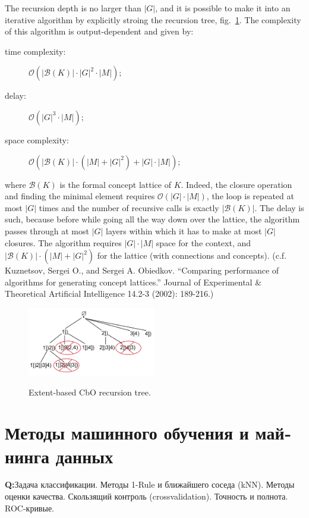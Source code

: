 \documentclass[a4paper]{article}
\newcommand{\rus}[1]{\foreignlanguage{russian}{#1}}
\begin{document}
The recursion depth is no larger than $|G|$, and it is possible to make it into an
iterative algorithm by explicitly stroing the recursion tree, fig.~\ref{fig:cbo_tree}.
The complexity of this algorithm is output-dependent and given by:
\begin{description}
    \item[time complexity:] $\mathcal{O}(|\mathcal{B}(K)|\cdot |G|^2 \cdot |M|)$;
    \item[delay:] $\mathcal{O}(|G|^3 \cdot |M|)$;
    \item[space complexity:] $\mathcal{O}(|\mathcal{B}(K)|\cdot(|M| + |G|^2)
                                          + |G| \cdot |M|)$;
\end{description}
where $\mathcal{B}(K)$ is the formal concept lattice of $K$. Indeed, the closure
operation and finding the minimal element requires $\mathcal{O}(|G| \cdot |M|)$,
the loop is repeated at most $|G|$ times and the number of recursive calls is exactly
$|\mathcal{B}(K)|$. The delay is such, because before while going all the way down
over the lattice, the algorithm passes through at most $|G|$ layers within which
it has to make at most $|G|$ closures. The algorithm requires $|G| \cdot |M|$ space
for the context, and $|\mathcal{B}(K)|\cdot(|M| + |G|^2)$ for the lattice (with
connections and concepts).
(c.f. Kuznetsov, Sergei O., and Sergei A. Obiedkov. ``Comparing performance of algorithms
for generating concept lattices.'' Journal of Experimental \& Theoretical Artificial
Intelligence 14.2-3 (2002): 189-216.)
\begin{figure}
    \centering
    \includegraphics[width=0.5\textwidth]{cbo_tree.png}
    \label{fig:cbo_tree}
    \caption{Extent-based CbO recursion tree.}
\end{figure}


\section{\rus{Методы машинного обучения и майнинга данных}} %
\label{sec:mldm}

\noindent\textbf{Q:}\rus{Задача классификации.  Методы 1-Rule и ближайшего соседа
(kNN). Методы оценки качества. Скользящий контроль (crossvalidation). Точность и
полнота. ROC-кривые.}
\end{document}
